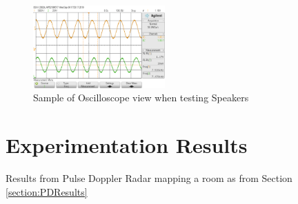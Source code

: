 \begin{figure}[h!]
    \centering
    \includegraphics[width = 0.45\textwidth]{images/scope_5.pdf}
    \caption{Sample of Oscilloscope view when testing Speakers}\label{fig:scope_5}
\end{figure}
\newpage
\section{Experimentation Results\label{appendix:PDResults}}
Results from Pulse Doppler Radar mapping a room as from Section \ref{section:PDResults}

